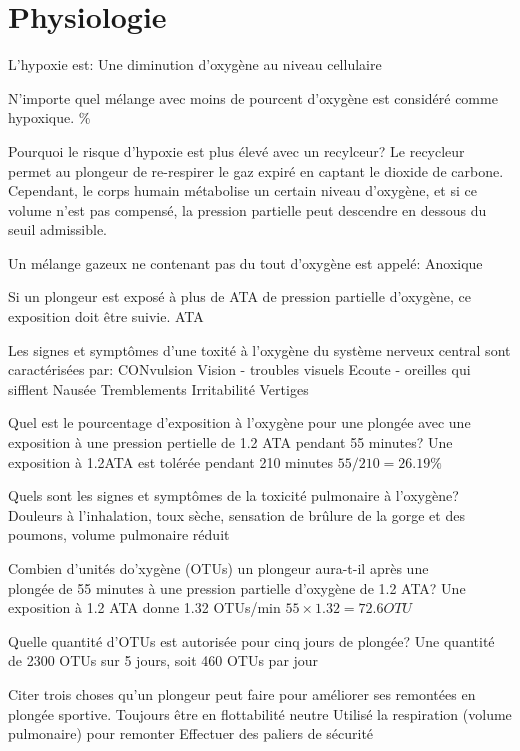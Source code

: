 \documentclass[english,12pt,a4paper]{article}
\begin{document}
	\section{Physiologie}
	\begin{outline}
		\1 L'hypoxie est:
			\2 Une diminution d'oxygène au niveau cellulaire

		\1 N'importe quel mélange avec moins de \underline{\hspace{1.5cm}} pourcent d'oxygène est considéré comme hypoxique.
			\%

		\1 Pourquoi le risque d'hypoxie est plus élevé avec un recylceur?
			\2 Le recycleur permet au plongeur de re-respirer le gaz expiré en captant le dioxide de carbone. Cependant, le corps humain métabolise un certain niveau d'oxygène, et si ce volume n'est pas compensé, la pression partielle peut descendre en dessous du seuil admissible.

		\1 Un mélange gazeux ne contenant pas du tout d'oxygène est appelé:
			\2 Anoxique

		\1 Si un plongeur est exposé à plus de \underline{\hspace{1.5cm}} ATA de pression partielle d'oxygène, ce exposition doit être suivie.
			 ATA

		\1 Les signes et symptômes d'une toxité à l'oxygène du système nerveux central sont caractérisées par:
			\2 CONvulsion
			\2 Vision - troubles visuels
			\2 Ecoute - oreilles qui sifflent
			\2 Nausée
			\2 Tremblements
			\2 Irritabilité
			\2 Vertiges

		\1 Quel est le pourcentage d'exposition à l'oxygène pour une plongée avec une exposition à une pression pertielle de 1.2 ATA pendant 55 minutes?
			\2 Une exposition à 1.2ATA est tolérée pendant 210 minutes
			\2 $55 / 210=26.19\%$

		\1 Quels sont les signes et symptômes de la toxicité pulmonaire à l'oxygène?
			\2 Douleurs à l'inhalation, toux sèche, sensation de brûlure de la gorge et des poumons, volume pulmonaire réduit

		\1 Combien d'unités do'xygène (OTUs) un plongeur aura-t-il après une\\plongée de 55 minutes à une pression partielle d'oxygène de 1.2 ATA?
			\2 Une exposition à 1.2 ATA donne 1.32 OTUs/min
			\2 $55\times1.32=72.6OTU$

		\1 Quelle quantité d'OTUs est autorisée pour cinq jours de plongée?
			\2 Une quantité de 2300 OTUs sur 5 jours, soit 460 OTUs par jour

		\1 Citer trois choses qu'un plongeur peut faire pour améliorer ses remontées en plongée sportive.
			\2 Toujours être en flottabilité neutre
			\2 Utilisé la respiration (volume pulmonaire) pour remonter
			\2 Effectuer des paliers de sécurité


\end{outline}
\end{document}
